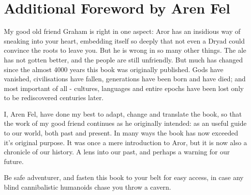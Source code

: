 \section{Additional Foreword by Aren Fel}

My good old friend Graham is right in one aspect: Aror has an insidious
way of sneaking into your heart, embedding itself so deeply that not
even a Dryad could convince the roots to leave you. But he is wrong in
so many other things. The ale has not gotten better, and the people
are still unfriendly. But much has changed since the almost 4000 years
this book was originally published. Gods have vanished, civilisations
have fallen, generations have been born and have died; and most important
of all - cultures, languages and entire epochs have been lost only to be
rediscovered centuries later.

I, Aren Fel, have done my best to adapt, change and translate the
book, so that the work of my good friend continues as he originally
intended: as an useful guide to our world, both past and present. In
many ways the book has now exceeded it's original purpose. It was once
a mere introduction to Aror, but it is now also a chronicle of our
history. A lens into our past, and perhaps a warning for our future.

Be safe adventurer, and fasten this book to your belt for easy access,
in case any blind cannibalistic humanoids chase you throw a cavern.

